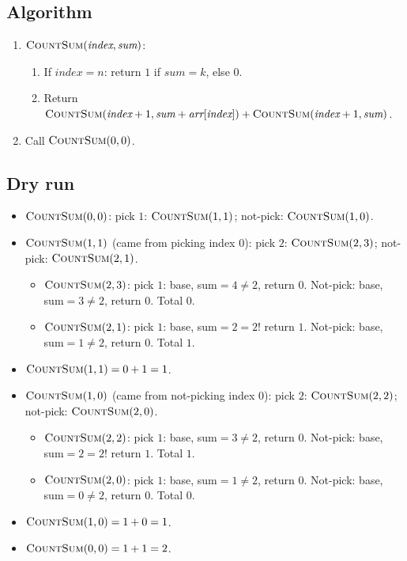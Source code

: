 \subsection*{Algorithm}

\begin{enumerate}
  \item $\textsc{CountSum}(\textit{index}, \textit{sum})$:
  \begin{enumerate}
    \item If $\textit{index} = n$: return $1$ if $\textit{sum}=k$, else
          $0$.
    \item Return $\textsc{CountSum}(\textit{index}+1, \textit{sum} +
          \textit{arr}[\textit{index}]) +
          \textsc{CountSum}(\textit{index}+1, \textit{sum})$.
  \end{enumerate}
  \item Call $\textsc{CountSum}(0,0)$.
\end{enumerate}

\subsection*{Dry run}


\begin{itemize}
  \item $\textsc{CountSum}(0,0)$: pick $1$:
        $\textsc{CountSum}(1,1)$; not-pick: $\textsc{CountSum}(1,0)$.
  \item $\textsc{CountSum}(1,1)$ (came from picking index $0$): pick
        $2$: $\textsc{CountSum}(2,3)$; not-pick:
        $\textsc{CountSum}(2,1)$.
  \begin{itemize}
    \item $\textsc{CountSum}(2,3)$: pick $1$: base, sum$=4\ne2$,
          return $0$. Not-pick: base, sum$=3\ne2$, return $0$. Total
          $0$.
    \item $\textsc{CountSum}(2,1)$: pick $1$: base, sum$=2=2$! return
          $1$. Not-pick: base, sum$=1\ne2$, return $0$. Total $1$.
  \end{itemize}
  \item $\textsc{CountSum}(1,1)=0+1=1$.
  \item $\textsc{CountSum}(1,0)$ (came from not-picking index $0$):
        pick $2$: $\textsc{CountSum}(2,2)$; not-pick:
        $\textsc{CountSum}(2,0)$.
  \begin{itemize}
    \item $\textsc{CountSum}(2,2)$: pick $1$: base, sum$=3\ne2$,
          return $0$. Not-pick: base, sum$=2=2$! return $1$. Total $1$.
    \item $\textsc{CountSum}(2,0)$: pick $1$: base, sum$=1\ne2$,
          return $0$. Not-pick: base, sum$=0\ne2$, return $0$. Total
          $0$.
  \end{itemize}
  \item $\textsc{CountSum}(1,0)=1+0=1$.
  \item $\textsc{CountSum}(0,0)=1+1=2$.
\end{itemize}

